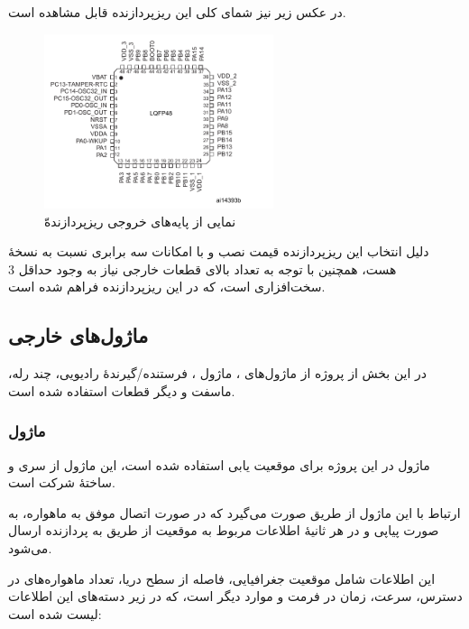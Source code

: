 در عکس زیر نیز شمای کلی این ریزپردازنده قابل مشاهده است.

\begin{figure}[!h]
	\begin{center}
		\includegraphics[width=0.6\textwidth]{images/STM32103xx.pdf}
	\end{center}
	\caption{نمایی از پایه‌های خروجی ریزپردازندهّ }
	\label{fig1:sec2:chap1}
\end{figure}


دلیل انتخاب این ریزپردازنده قیمت نصب و با امکانات سه برابری نسبت به نسخهٔ
 هست، همچنین با توجه به تعداد بالای قطعات خارجی نیاز به وجود حداقل $3$
 سخت‌افزاری است، که در این ریزپردازنده فراهم شده است.

\subsection{ماژول‌های خارجی}\label{subsec1:sec2:chap5}

در این بخش از پروژه از ماژول‌های ، ماژول ،‌ فرستنده/گیرندهٔ رادیویی،
چند رله، ماسفت و دیگر قطعات استفاده شده است.


\subsubsection{ماژول }\label{subsubsec1:subsec1:sec2:chap5}

ماژول  در این پروژه برای موقعیت یابی استفاده شده است، این ماژول از سری  و ساختهٔ شرکت  است.

ارتباط با این ماژول از طریق  صورت می‌گیرد که در صورت اتصال موفق به ماهواره، به صورت پیاپی و در هر ثانیهٔ اطلاعات مربوط به موقعیت از طریق  به پردازنده ارسال می‌شود.

این اطلاعات شامل موقعیت جغرافیایی، فاصله از سطح دریا، تعداد ماهواره‌های در دسترس، سرعت، زمان در فرمت  و موارد دیگر است، که در زیر دسته‌های این اطلاعات لیست شده است:

